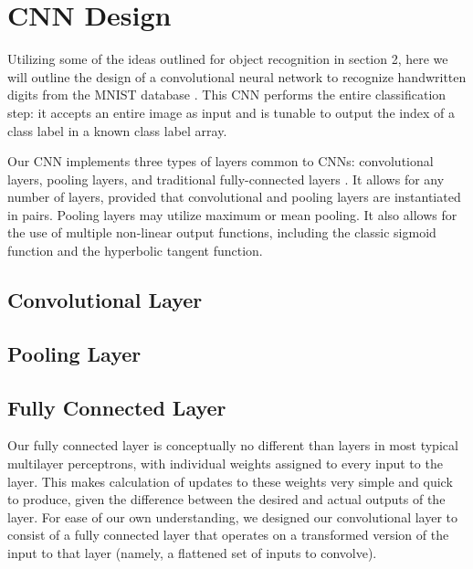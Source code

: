 \documentclass[10pt,twocolumn,letterpaper]{article}
\begin{document}
\section{CNN Design}

Utilizing some of the ideas outlined for object recognition in section 2,
here we will outline the design of a convolutional neural network to recognize
handwritten digits from the MNIST database \cite{MNIST}.
This CNN performs the entire classification step: it accepts an entire image as input
and is tunable to output the index of a class label in a known class label array.

Our CNN implements three types of layers common to CNNs: convolutional layers, pooling layers,
and traditional fully-connected layers \cite{ImageNet} \cite{Verydeep}.
It allows for any number of layers, provided that convolutional and pooling layers are
instantiated in pairs.
Pooling layers may utilize maximum or mean pooling.
It also allows for the use of multiple non-linear output functions,
including the classic sigmoid function and the hyperbolic tangent function.

\subsection{Convolutional Layer}

\subsection{Pooling Layer}

\subsection{Fully Connected Layer}

Our fully connected layer is conceptually no different than layers in most typical multilayer
perceptrons, with individual weights assigned to every input to the layer.
This makes calculation of updates to these weights very simple and quick to produce, given the
difference between the desired and actual outputs of the layer.
For ease of our own understanding, we designed our convolutional layer to consist of a
fully connected layer that operates on a transformed version of the input to that layer
(namely, a flattened set of inputs to convolve).
\end{document}

